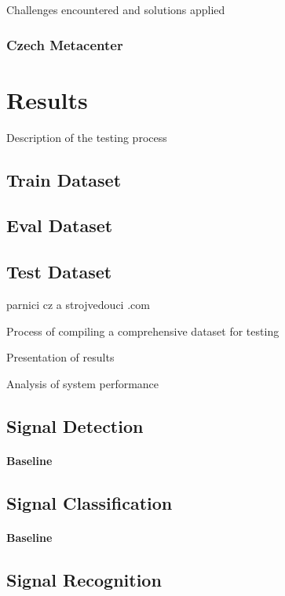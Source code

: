 \documentclass[english, ing, kiv, he, iso690alph, pdf, viewonly]{fasthesis}
\begin{document}
Challenges encountered and solutions applied
\subsection{Czech Metacenter}

\chapter{Results}

Description of the testing process


\section{Train Dataset}

\section{Eval Dataset}

\section{Test Dataset}
 parnici cz a strojvedouci .com

 
Process of compiling a comprehensive dataset for testing


Presentation of results


Analysis of system performance


\section{Signal Detection}

\subsubsection{Baseline}


\section{Signal Classification}


\subsubsection{Baseline}


\section{Signal Recognition}
\end{document}
